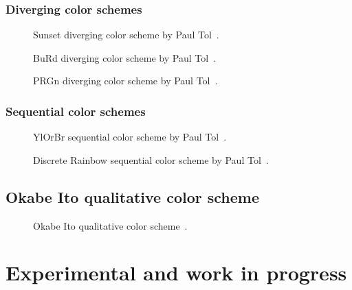 \documentclass{article}
\begin{document}
\subsubsection{Diverging color schemes}

\begin{figure}[ht]
    \centering
    \caption{Sunset diverging color scheme by Paul Tol~\cite{Tol}.}
    \label{fig:T-D-S}
\end{figure}

\begin{figure}[ht]
    \centering
    \caption{BuRd diverging color scheme by Paul Tol~\cite{Tol}.}
    \label{fig:T-D-BR}
\end{figure}

\begin{figure}[ht]
    \centering
    \caption{PRGn diverging color scheme by Paul Tol~\cite{Tol}.}
    \label{fig:T-D-PG}
\end{figure}

\subsubsection{Sequential color schemes}

\begin{figure}[ht]
    \centering
    \caption{YlOrBr sequential color scheme by Paul Tol~\cite{Tol}.}
    \label{fig:T-S-YB}
\end{figure}

\begin{figure}[ht]
    \centering
    \caption{Discrete Rainbow sequential color scheme by Paul Tol~\cite{Tol}.}
    \label{fig:T-S-DR}
\end{figure}

\subsection{Okabe Ito qualitative color scheme}

\begin{figure}[ht]
    \centering
    \caption{Okabe Ito qualitative color scheme~\cite{Ichihara_2008}.}
    \label{fig:OI}
\end{figure}


\section{Experimental and work in progress}
\end{document}
